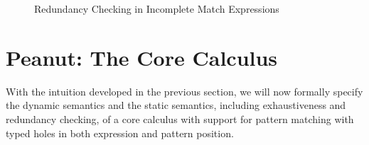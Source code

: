 \documentclass[runningheads,envcountsame,a4paper]{llncs}
\begin{document}
\begin{figure}[ht]
  \centering
  \hspace*{\fill}%
  \hfill%
  \hfill%
  \hspace*{\fill}%
  \caption{Redundancy Checking in Incomplete Match Expressions}
  \label{fig:red-hole}
\end{figure}

\section{Peanut: The Core Calculus}
With the intuition developed in the previous section, we will now formally specify the dynamic semantics and the static semantics, including exhaustiveness and redundancy checking, of a core calculus with support for pattern matching with typed holes in both expression and pattern position. 



\end{document}
